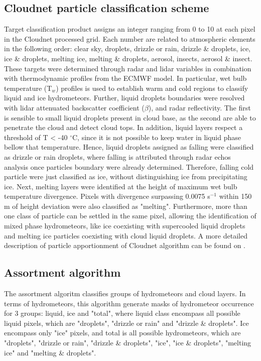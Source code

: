 \documentclass[journal abbreviation, manuscript]{copernicus}
\begin{document}
\subsection{Cloudnet particle classification scheme}

Target classification product assigns an integer ranging from 0 to 10 at each pixel in the Cloudnet processed grid. Each number are related to atmospheric elements in the following order: clear sky, droplets, drizzle or rain, drizzle \& droplets, ice, ice \& droplets, melting ice, melting \& droplets, aerosol, insects, aerosol \& insect. These targets were determined through radar and lidar variables in combination with thermodynamic profiles from the ECMWF model. In particular, wet bulb temperature (T$_w$) profiles is used to establish warm and cold regions to classify liquid and ice hydrometeors. 
Further, liquid droplets boundaries were resolved with lidar attenuated backscatter coefficient ($\beta$), and radar reflectivity. The first is sensible to small liquid droplets present in cloud base, as the second are able to penetrate the cloud and detect cloud tops.
In addition, liquid layers respect a threshold of T < -40 $^{\circ}$C, since it is not possible to keep water in liquid phase bellow that temperature. Hence, liquid droplets assigned as falling were classified as drizzle or rain droplets, where falling is attributed through radar echos analysis once particles boundary were already determined. Therefore, falling cold particle were just classified as ice, without distinguishing ice from precipitating ice. Next, melting layers were identified at the height of maximum wet bulb temperature divergence. Pixels with divergence surpassing 0.0075 s$^{-1}$ within 150 m of height deviation were also classified as "melting". Furthermore, more than one class of particle can be settled in the same pixel, allowing the identification of mixed phase hydrometeors, like ice coexisting with supercooled liquid droplets and melting ice particles coexisting with cloud liquid droplets. A more detailed description of particle apportionment of Cloudnet algorithm can be found on \citet{Hogan2004}. 

\subsection{Assortment algorithm}\label{sec:classification_algorithm}

The assortment algoritm classifies groups of hydrometeors and cloud layers. In terms of hydrometeors, this algorithm generate masks of hydrometeor occurrence for 3 groups: liquid, ice and "total", where liquid class encompass all possible liquid pixels, which are "droplets", "drizzle or rain" and "drizzle \& droplets". Ice encompass only "ice" pixels, and total is all possible hydrometeors, which are "droplets", "drizzle or rain", "drizzle \& droplets", "ice", "ice \& droplets", "melting ice" and "melting \& droplets".
\end{document}
